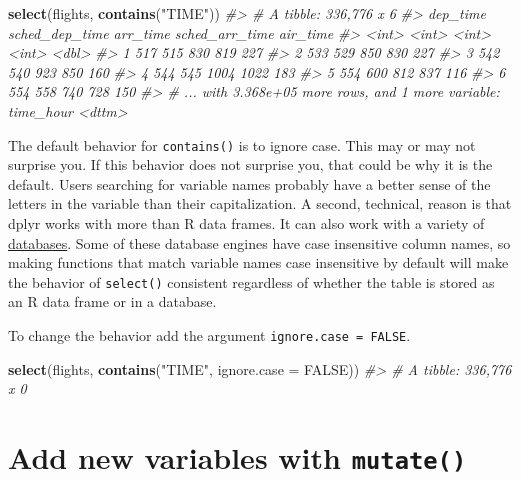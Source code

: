 \documentclass[]{book}
\newenvironment{Shaded}{\begin{snugshade}}{\end{snugshade}}
\newcommand{\CommentTok}[1]{\textcolor[rgb]{0.56,0.35,0.01}{\textit{#1}}}
\newcommand{\DataTypeTok}[1]{\textcolor[rgb]{0.13,0.29,0.53}{#1}}
\newcommand{\KeywordTok}[1]{\textcolor[rgb]{0.13,0.29,0.53}{\textbf{#1}}}
\newcommand{\NormalTok}[1]{#1}
\newcommand{\OtherTok}[1]{\textcolor[rgb]{0.56,0.35,0.01}{#1}}
\newcommand{\StringTok}[1]{\textcolor[rgb]{0.31,0.60,0.02}{#1}}
\theoremstyle{plain}
\theoremstyle{remark}
\begin{document}
\begin{Shaded}
\begin{Highlighting}[]
\KeywordTok{select}\NormalTok{(flights, }\KeywordTok{contains}\NormalTok{(}\StringTok{"TIME"}\NormalTok{))}
\CommentTok{#> # A tibble: 336,776 x 6}
\CommentTok{#>   dep_time sched_dep_time arr_time sched_arr_time air_time}
\CommentTok{#>      <int>          <int>    <int>          <int>    <dbl>}
\CommentTok{#> 1      517            515      830            819      227}
\CommentTok{#> 2      533            529      850            830      227}
\CommentTok{#> 3      542            540      923            850      160}
\CommentTok{#> 4      544            545     1004           1022      183}
\CommentTok{#> 5      554            600      812            837      116}
\CommentTok{#> 6      554            558      740            728      150}
\CommentTok{#> # ... with 3.368e+05 more rows, and 1 more variable: time_hour <dttm>}
\end{Highlighting}
\end{Shaded}

The default behavior for \texttt{contains()} is to ignore case. This may
or may not surprise you. If this behavior does not surprise you, that
could be why it is the default. Users searching for variable names
probably have a better sense of the letters in the variable than their
capitalization. A second, technical, reason is that dplyr works with
more than R data frames. It can also work with a variety of
\href{https://db.rstudio.com/dplyr/}{databases}. Some of these database
engines have case insensitive column names, so making functions that
match variable names case insensitive by default will make the behavior
of \texttt{select()} consistent regardless of whether the table is
stored as an R data frame or in a database.

To change the behavior add the argument \texttt{ignore.case\ =\ FALSE}.

\begin{Shaded}
\begin{Highlighting}[]
\KeywordTok{select}\NormalTok{(flights, }\KeywordTok{contains}\NormalTok{(}\StringTok{"TIME"}\NormalTok{, }\DataTypeTok{ignore.case =} \OtherTok{FALSE}\NormalTok{))}
\CommentTok{#> # A tibble: 336,776 x 0}
\end{Highlighting}
\end{Shaded}

\hypertarget{add-new-variables-with-mutate}{%
\section{\texorpdfstring{Add new variables with
\texttt{mutate()}}{Add new variables with mutate()}}\label{add-new-variables-with-mutate}}
\end{document}
